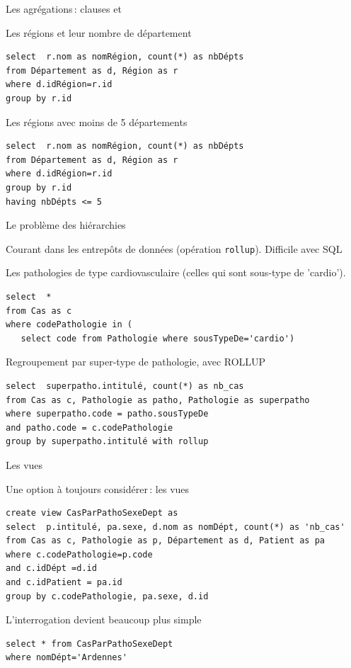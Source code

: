 \begin{frame}[fragile]{Les agrégations\,: clauses  et}

\vfill
Les régions et leur nombre de département

\begin{verbatim}
select  r.nom as nomRégion, count(*) as nbDépts 
from Département as d, Région as r
where d.idRégion=r.id
group by r.id
\end{verbatim}

\vfill
Les régions avec moins de 5 départements

\begin{verbatim}
select  r.nom as nomRégion, count(*) as nbDépts 
from Département as d, Région as r
where d.idRégion=r.id
group by r.id
having nbDépts <= 5
\end{verbatim}
\end{frame}


\begin{frame}[fragile]{Le problème des hiérarchies}
 
Courant dans les entrepôts de données (opération \texttt{rollup}). Difficile avec SQL

\vfill
Les pathologies de type cardiovasculaire (celles qui sont sous-type de 'cardio').

\begin{verbatim}
select  * 
from Cas as c 
where codePathologie in (
   select code from Pathologie where sousTypeDe='cardio')
\end{verbatim}

\vfill

Regroupement par super-type de pathologie, avec ROLLUP

\begin{verbatim}
select  superpatho.intitulé, count(*) as nb_cas
from Cas as c, Pathologie as patho, Pathologie as superpatho
where superpatho.code = patho.sousTypeDe
and patho.code = c.codePathologie
group by superpatho.intitulé with rollup
\end{verbatim}

\end{frame}

\begin{frame}[fragile]{Les vues}
 
Une option à toujours considérer\,: les vues
\vfill
\begin{verbatim}
create view CasParPathoSexeDept as
select  p.intitulé, pa.sexe, d.nom as nomDépt, count(*) as 'nb_cas'
from Cas as c, Pathologie as p, Département as d, Patient as pa
where c.codePathologie=p.code
and c.idDépt =d.id
and c.idPatient = pa.id
group by c.codePathologie, pa.sexe, d.id
\end{verbatim}

\vfill
L'interrogation devient beaucoup plus simple

\begin{verbatim}
select * from CasParPathoSexeDept
where nomDépt='Ardennes'
\end{verbatim}
\end{frame}



